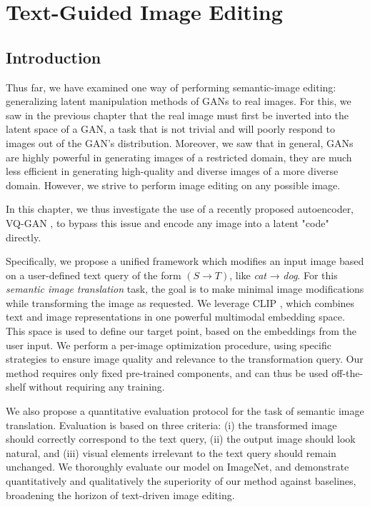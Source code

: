 \chapter{Text-Guided Image Editing}
\label{chapter:flexit}




\section{Introduction}

Thus far, we have examined one way of performing semantic-image editing: 
generalizing latent manipulation methods of \ac{GAN}s to real images. For this, 
we saw in the previous chapter that the real image must first be inverted into 
the latent space of a \ac{GAN}, a task that is not trivial and will poorly respond to 
 images out of the \ac{GAN}'s distribution. Moreover, we saw that in general, \ac{GAN}s 
 are highly powerful in generating images of a restricted domain, they are much less 
 efficient in generating high-quality and diverse images of a more diverse domain. 
 However, we strive to perform image editing on any possible image. 
 
 In this chapter, 
 we thus investigate the use of a recently proposed autoencoder, VQ-GAN \citep{esser2021taming}, 
 to bypass this issue and encode any image into a latent "code" directly. 
 
Specifically, we propose  a unified framework which modifies an input image based
 on a user-defined text query of the form $(S \rightarrow T)$, like \textit{cat} → \textit{dog}.
  For this \textit{semantic image translation} task, the goal is to make minimal image
   modifications  while transforming the image as requested.
We leverage \ac{CLIP} \citep{radford2021learning},  which combines text and image representations in 
one powerful multimodal embedding space. This space is used to define our target point,
 based on the embeddings from the user input. We perform a per-image optimization 
 procedure, using specific  strategies to ensure image quality and relevance to the 
 transformation query. Our method requires only fixed pre-trained components, and can 
 thus be used off-the-shelf  without  requiring any training. 

We also propose a quantitative evaluation protocol for the task of semantic image 
translation. 
Evaluation is based on three criteria: (i) the transformed image should correctly 
correspond to the text query, (ii) the output image should look natural,  and (iii) 
visual elements irrelevant to the text query should remain unchanged. 
We thoroughly evaluate our model on ImageNet, and  demonstrate quantitatively and 
qualitatively the superiority of our method against baselines, broadening the horizon 
of text-driven image editing.


